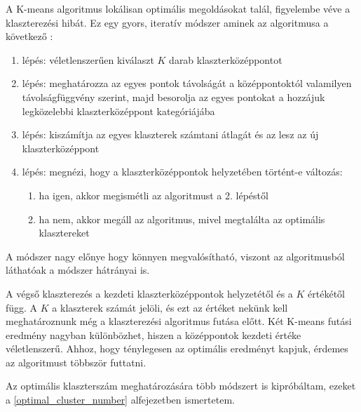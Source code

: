 A K-means algoritmus lokálisan optimális megoldásokat talál, figyelembe véve a klaszterezési hibát. Ez egy gyors, iteratív módszer aminek az algoritmusa a következő \cite{tomatoleaf}:
\begin{enumerate}
\item lépés: véletlenszerűen kiválaszt $K$ darab klaszterközéppontot
\item lépés: meghatározza az egyes pontok távolságát a középpontoktól valamilyen távolságfüggvény szerint, majd besorolja az egyes pontokat a hozzájuk legközelebbi klaszterközéppont kategóriájába
\item lépés: kiszámítja az egyes klaszterek számtani átlagát és az lesz az új klaszterközéppont
\item lépés: megnézi, hogy a klaszterközéppontok helyzetében történt-e változás:
    \begin{enumerate}
    \item ha igen, akkor megismétli az algoritmust a 2. lépéstől
    \item ha nem, akkor megáll az algoritmus, mivel megtalálta az optimális klasztereket
    \end{enumerate}
\end{enumerate}

A módszer nagy előnye hogy könnyen megvalósítható, viszont az algoritmusból láthatóak a módszer hátrányai is.

A végső klaszterezés a kezdeti klaszterközéppontok helyzetétől és a $K$ értékétől függ. A $K$ a klaszterek számát jelöli, és ezt az értéket nekünk kell meghatároznunk még a klaszterezési algoritmus futása előtt. Két K-means futási eredmény nagyban különbözhet, hiszen a középpontok kezdeti értéke véletlenszerű. Ahhoz, hogy ténylegesen az optimális eredményt kapjuk, érdemes az algoritmust többször futtatni.

Az optimális klaszterszám meghatározására több módszert is kipróbáltam, ezeket a \ref{optimal_cluster_number} alfejezetben ismertetem.

